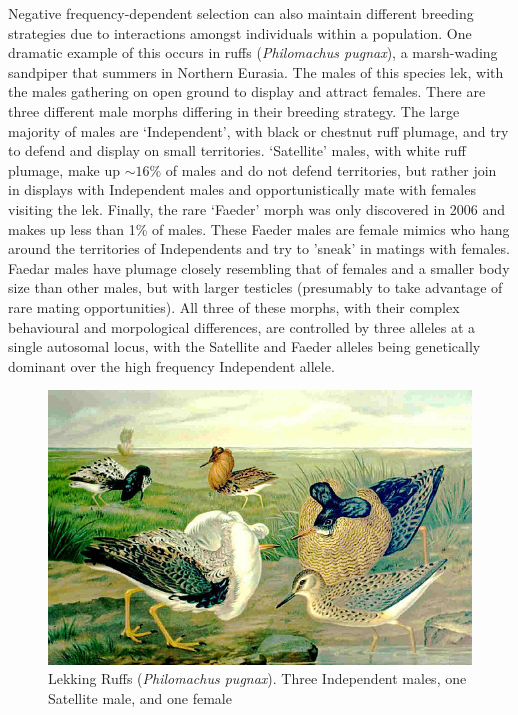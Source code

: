 {Negative frequency-dependent selection can also maintain different 
breeding strategies due to interactions amongst individuals within a population. One
dramatic example of this occurs in ruffs ({\it Philomachus pugnax}), a
marsh-wading sandpiper that summers in Northern Eurasia. The males of this species
lek, with the males gathering on open ground to display and attract females. There are three different male morphs differing in their breeding
strategy. The large majority of males are `Independent', with black or
chestnut ruff plumage, and try to defend and display on small territories. `Satellite' males, with white ruff plumage, make
up $\sim 16\%$ of males and do not defend territories, but rather join
in displays with Independent males and opportunistically mate with
females visiting the lek. Finally, the rare `Faeder' morph was only discovered
in 2006 \citep{jukema2006permanent} and makes up less than 1\% of males. These Faeder males are female mimics who hang
around the territories of Independents and try to 'sneak' in matings with females. Faedar males have plumage closely resembling
that of females and a smaller body size than other males, but with larger testicles (presumably to
take advantage of rare mating opportunities). All three of these
morphs, with their complex behavioural and morpological differences,
are controlled by three alleles at a single autosomal locus, with the
Satellite and Faeder alleles being genetically dominant over the high frequency
Independent allele.
\begin{figure}
\begin{center}   %
  \includegraphics[width = 0.8 \textwidth]{illustration_images/single_locus_selection/Ruffs/Philomachus_pugnax_naumann.jpg}
\end{center}
\caption{Lekking Ruffs ({\it Philomachus pugnax}). Three Independent males, one Satellite male, and one female
}
\end{figure}}
